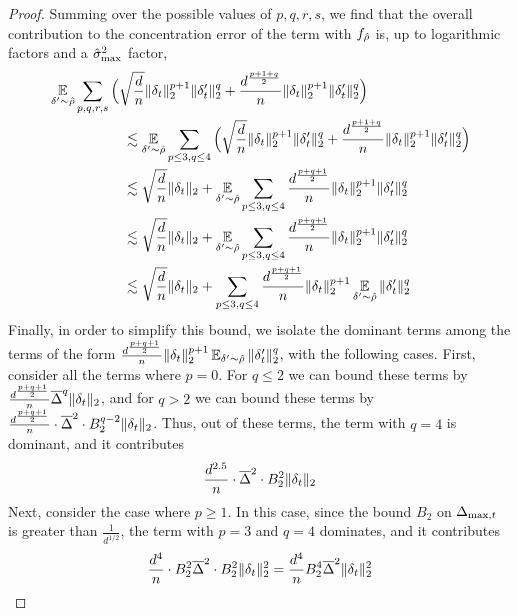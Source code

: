 \begin{proof}
Summing over the possible values of $p, q, r, s$, we find that the overall contribution to the concentration error of the term with $f_{{\hat{\rho}}}$ is, up to logarithmic factors and a $\hat{\sigma}_{\textup{max}}^2$ factor,
\begin{align}
& \operatorname*{\mathbb{E}}_{\delta' \sim {\hat{\rho}}} \sum_{p, q, r, s} \Big(\sqrt{\frac{d}{n}} \|\delta_t\|_2^{p + 1} \|\delta_t'\|_2^q + \frac{d^{\frac{p + 1 + q}{2}}}{n} \|\delta_t\|_2^{p + 1} \|\delta_t'\|_2^q \Big) \\
& \,\,\,\,\,\,\,\,\,\,\,\,\,\,\,\,\,\,\,\,\,\,\,\,\,\,\,\,\,\,\,\, \lesssim \operatorname*{\mathbb{E}}_{\delta' \sim {\hat{\rho}}} \sum_{p \leq 3, q \leq 4} \Big(\sqrt{\frac{d}{n}} \|\delta_t\|_2^{p + 1} \|\delta_t'\|_2^q + \frac{d^{\frac{p + 1 + q}{2}}}{n} \|\delta_t\|_2^{p + 1} \|\delta_t'\|_2^q \Big) \\
& \,\,\,\,\,\,\,\,\,\,\,\,\,\,\,\,\,\,\,\,\,\,\,\,\,\,\,\,\,\,\,\, \lesssim \sqrt{\frac{d}{n}} \|\delta_t\|_2 + 
\operatorname*{\mathbb{E}}_{\delta' \sim {\hat{\rho}}} \sum_{p \leq 3, q \leq 4} \frac{d^{\frac{p + q + 1}{2}}}{n} \|\delta_t\|_2^{p + 1} \|\delta_t'\|_2^q \\
& \,\,\,\,\,\,\,\,\,\,\,\,\,\,\,\,\,\,\,\,\,\,\,\,\,\,\,\,\,\,\,\, \lesssim \sqrt{\frac{d}{n}} \|\delta_t\|_2 + 
\operatorname*{\mathbb{E}}_{\delta' \sim {\hat{\rho}}} \sum_{p \leq 3, q \leq 4} \frac{d^{\frac{p + q + 1}{2}}}{n} \|\delta_t\|_2^{p + 1} \|\delta_t'\|_2^q \\
& \,\,\,\,\,\,\,\,\,\,\,\,\,\,\,\,\,\,\,\,\,\,\,\,\,\,\,\,\,\,\,\, \lesssim \sqrt{\frac{d}{n}} \|\delta_t\|_2 + \sum_{p \leq 3, q \leq 4} \frac{d^{\frac{p + q + 1}{2}}}{n} \|\delta_t\|_2^{p + 1} 
\operatorname*{\mathbb{E}}_{\delta' \sim {\hat{\rho}}} \|\delta_t'\|_2^q
\end{align}
Finally, in order to simplify this bound, we isolate the dominant terms among the terms of the form $\frac{d^{\frac{p + q + 1}{2}}}{n} \|\delta_t\|_2^{p + 1} \operatorname*{\mathbb{E}}_{\delta' \sim {\hat{\rho}}} \|\delta_t'\|_2^q$, with the following cases. First, consider all the terms where $p = 0$. For $q \leq 2$ we can bound these terms by $\frac{d^{\frac{p + q + 1}{2}}}{n} \overline{\Delta}^q \|\delta_t\|_2$, and for $q > 2$ we can bound these terms by $\frac{d^{\frac{p + q + 1}{2}}}{n} \cdot \overline{\Delta}^2 \cdot B_2^{q - 2} \|\delta_t\|_2$. Thus, out of these terms, the term with $q = 4$ is dominant, and it contributes
\begin{align}
\frac{d^{2.5}}{n} \cdot \overline{\Delta}^2 \cdot B_2^2 \|\delta_t\|_2
\end{align}
Next, consider the case where $p \geq 1$. In this case, since the bound $B_2$ on $\Delta_{\textup{max}, t}$ is greater than $\frac{1}{d^{1/2}}$, the term with $p = 3$ and $q = 4$ dominates, and it contributes
\begin{align}
\frac{d^4}{n} \cdot B_2^2 \deltaBar^2 \cdot B_2^2 \|\delta_t\|_2^2 = \frac{d^4}{n} B_2^4 \deltaBar^2 \|\delta_t\|_2^2

\end{align}
\end{proof}
